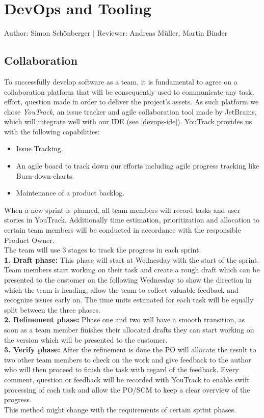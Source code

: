 \documentclass{scrreprt}
\begin{document}
\chapter{DevOps and Tooling} 
Author: Simon Sch\"onberger |
Reviewer: Andreas M\"uller, Martin Binder
\section{Collaboration} 
To successfully develop software as a team, it is fundamental to agree on a collaboration
platform that will be consequently used to communicate any task, effort, question
made in order to deliver the project's assets.
As such platform we chose \emph{YouTrack}, an issue tracker and agile collaboration tool made
by JetBrains, which will integrate well with our IDE (see \ref{devops-ide}).
YouTrack provides us with the following capabilities:
\begin{itemize}
  \item Issue Tracking.
  \item An agile board to track down our efforts including agile progress tracking like
    Burn-down-charts.
  \item Maintenance of a product backlog.
\end{itemize}
When a new sprint is planned, all team members will record tasks and user stories in
YouTrack. Additionally time estimation, prioritization and allocation to certain team members 
will be conducted in accordance with the responsible Product Owner.\\
The team will use 3 stages to track the progress in each sprint. \\
\textbf{1. Draft phase:} This phase will start at Wednesday with the start of the sprint. Team members start working on their task and create a rough draft which can be presented to the customer on the following Wednesday to show the direction in which the team is heading, allow the team to collect valuable feedback and recognize issues early on. The time units estimated for each task will be equally split between the three phases.  \\
\textbf{2. Refinement phase:} Phase one and two will have a smooth transition, as soon as a team member finishes their allocated drafts they can start working on the version which will be presented to the customer. \\  
\textbf{3. Verify phase:} After the refinement is done the PO will allocate the result to two other team members to check on the work and give feedback to the author who will then proceed to finish the task with regard of the feedback.
Every comment, question or feedback will be recorded with YouTrack to enable swift processing of each task and allow the PO/SCM to keep a clear overview of the progress.\\
This method might change with the requirements of certain sprint phases.\\
\end{document}
